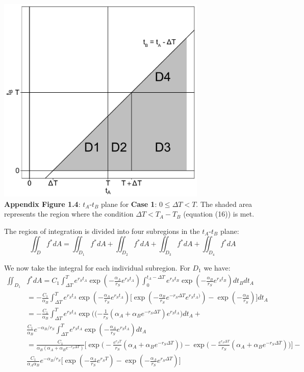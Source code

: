 \documentclass{article}
\begin{document}
\begin{center}
\includegraphics[width=0.75\textwidth]{Subintegral}
\centering
\\
\textbf{Appendix Figure 1.4}: $t_A$-$t_B$ plane for \textbf{Case 1}: $0 \leq \Delta T < T$.  The shaded area represents the region where the condition $\Delta T < T_A - T_B$ (equation (16)) is met.
\end{center}

The region of integration is divided into four subregions in the $t_A$-$t_B$ plane:
\begin{equation}
\iint_D f^* dA = \iint_{D_1} f^* dA + \iint_{D_2} f^* dA + \iint_{D_3} f^* dA + \iint_{D_4} f^* dA
\end{equation}

We now take the integral for each individual subregion.  For $D_1$ we have:
\begin{equation}
\begin{split}
\iint_{D_1} & f^* dA = C_1 \int_{\Delta T}^T e^{r_S t_A} \exp(-\frac{\alpha_A}{r_S} e^{r_S t_A}) \int_0^{t_A - \Delta T} e^{r_S t_B} \exp(-\frac{\alpha_B}{r_S} e^{r_S t_B}) dt_B dt_A \\
&= -\frac{C_1}{\alpha_B} \int_{\Delta T}^T e^{r_S t_A} \exp(-\frac{\alpha_A}{r_S} e^{r_S t_A}) \Big[\exp(-\frac{\alpha_B}{r_S} e^{-r_S \Delta T} e^{r_S t_A)}) - \exp(-\frac{\alpha_B}{r_S})\Big] dt_A \\
& = -\frac{C_1}{\alpha_B} \int_{\Delta T}^T e^{r_S t_A} \exp\Big((-\frac{1}{r_S}(\alpha_A + \alpha_B e^{-r_S \Delta T}) e^{r_S t_A}\Big) dt_A +\\
& \frac{C_1}{\alpha_B} e^{-\alpha_B/r_S} \int_{\Delta T}^T e^{r_S t_A} \exp(-\frac{\alpha_A}{r_S} e^{r_S t_A}) dt_A \\
&= \frac{C_1}{\alpha_B(\alpha_A + \alpha_B e^{-r_S \Delta T})} \Big[\exp\Big(-\frac{e^{r_S T}}{r_S} (\alpha_A + \alpha_B e^{-r_S \Delta T})\Big) - \exp\Big(-\frac{e^{r_S \Delta T}}{r_S} (\alpha_A + \alpha_B e^{-r_S \Delta T})\Big)\Big] - \\
&\frac{C_1}{\alpha_A \alpha_B} e^{-\alpha_B/r_S} \Big[\exp(-\frac{\alpha_A}{r_S} e^{r_S T}) - \exp(-\frac{\alpha_A}{r_S} e^{r_S \Delta T})\Big] 
\end{split}
\end{equation}
\end{document}
